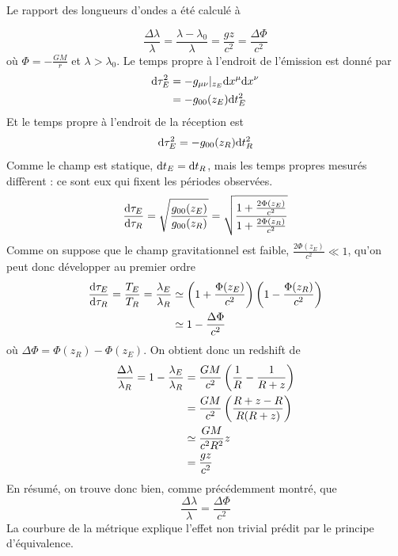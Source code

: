 Le rapport des longueurs d'ondes a été calculé à

\begin{equation}
    \frac{\Delta \lambda}{\lambda} = \frac{\lambda -\lambda_0}{\lambda} = \frac{gz}{c^2}=\frac{\Delta \Phi}{c^2}
\end{equation}
où $\Phi = - \frac{GM}{r}$ et $\lambda > \lambda_0$. Le temps propre à l'endroit de l'émission est donné par
\begin{align}
    \mathrm{d} \tau_E^2 &= -g_{\mu \nu}|_{z_E}\mathrm{d} x^{\mu}\mathrm{d} x^{\nu}\\
    &= - g_{0 0}(z_E)\mathrm{d} t^2_E
\end{align}
Et le temps propre à l'endroit de la réception est 
\begin{align}
    \mathrm{d} \tau_E^2 = - g_{0 0}(z_R)\mathrm{d} t^2_R
\end{align}
Comme le champ est statique, $\mathrm{d} t_E = \mathrm{d} t_R$, mais les temps propres mesurés diffèrent : ce sont eux qui fixent les périodes observées.
\begin{equation}
    \frac{\mathrm{d} \tau_E}{\mathrm{d} \tau_R} = \sqrt{\frac{g_{00}(z_E)}{g_{00}(z_R)}} = \sqrt{\frac{1+\frac{2\Phi(z_E)}{c^2}}{1+\frac{2\Phi(z_R)}{c^2}}}
\end{equation}
Comme on suppose que le champ gravitationnel est faible, $\frac{2\Phi(z_E)}{c^2} \ll 1$, qu'on peut donc développer au premier ordre 
\begin{align}
     \frac{\mathrm{d} \tau_E}{\mathrm{d} \tau_R} = \frac{T_E}{T_R} = \frac{\lambda_E}{\lambda_R} &\simeq \left( 1 +\frac{\Phi(z_E)}{c^2}\right) \left( 1-\frac{\Phi(z_R)}{c^2} \right)\\
     & \simeq 1 - \frac{\Delta \Phi}{c^2}
\end{align}
où $\Delta\Phi = \Phi(z_R) - \Phi(z_E)$. On obtient donc un redshift de
\begin{align}
    \frac{\Delta \lambda}{\lambda_R} = 1 - \frac{\lambda_E}{\lambda_R} &= \frac{GM}{c^2}\left(\frac{1}{R} -\frac{1}{R+z}\right)\\
    &= \frac{GM}{c^2}\left( \frac{R + z - R}{R(R+z)}\right)\\
    & \simeq \frac{GM}{c^2 R^2}z\\
    &=\frac{gz}{c^2}
\end{align}
En résumé, on trouve donc bien, comme précédemment montré, que
\begin{equation}
    \boxed{\frac{\Delta \lambda}{\lambda} = \frac{\Delta \Phi}{c^2}}
\end{equation}
La courbure de la métrique explique l’effet non trivial prédit par le principe d’équivalence.

